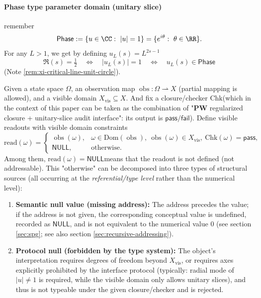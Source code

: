 \paragraph{Phase type parameter domain (unitary slice)}
remember
\[
\mathsf{Phase}:=\{u\in\CC:\ |u|=1\}=\{e^{i\theta}:\ \theta\in\RR\}.
\]
For any \(L>1\), we get by defining \(u_L(s)=L^{2s-1}\)
\[
\Re(s)=\tfrac12\quad\Longleftrightarrow\quad |u_L(s)|=1\quad\Longleftrightarrow\quad u_L(s)\in \mathsf{Phase}
\]
(Note \ref{rem:xi-critical-line-unit-circle}).

\begin{definition}\label{def:xi-visible-read-null}
Given a state space \(\Omega\), an observation map \(\operatorname{obs}:\Omega\rightharpoonup X\) (partial mapping is allowed), and a visible domain \(X_{\mathrm{vis}}\subseteq X\).
And fix a closure/checker \(\mathrm{Chk}\) ​​(which in the context of this paper can be taken as the combination of "\(\mathbf{PW}\) regularized closure + unitary-slice audit interface": its output is \(\mathsf{pass}/\mathsf{fail}\)).
Define visible readouts with visible domain constraints
\[
\mathrm{read}(\omega)=
\begin{cases}
\operatorname{obs}(\omega), &
\omega\in\mathrm{Dom}(\operatorname{obs}),\ \operatorname{obs}(\omega)\in X_{\mathrm{vis}},\ \mathrm{Chk}(\omega)=\mathsf{pass},\\
\mathsf{NULL}, & \text{otherwise}.
\end{cases}
\]
Among them, \(\mathrm{read}(\omega)=\mathsf{NULL}\) ​​means that the readout is not defined (not addressable).
This "otherwise" can be decomposed into three types of structural sources (all occurring at the \emph{referential/type level} rather than the numerical level):
\begin{enumerate}
  \item \textbf{Semantic null value (missing address):} The address precedes the value; if the address is not given, the corresponding conceptual value is undefined, recorded as \(\mathsf{NULL}\), and is not equivalent to the numerical value \(0\) (see section \ref{sec:spg}; see also section \ref{sec:recursive-addressing}).
  \item \textbf{Protocol null (forbidden by the type system):} The object's interpretation requires degrees of freedom beyond \(X_{\mathrm{vis}}\), or requires axes explicitly prohibited by the interface protocol (typically: radial mode of \(|u|\neq 1\) is required, while the visible domain only allows unitary slices), and thus is not typeable under the given closure/checker and is rejected.

\end{enumerate}
\end{definition}
